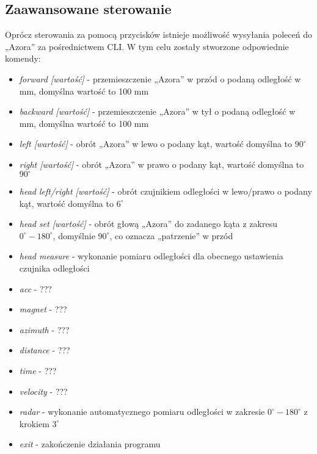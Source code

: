     \subsection{Zaawansowane sterowanie}
        Oprócz sterowania za pomocą przycisków istnieje możliwość wysyłania poleceń do „Azora” za pośrednictwem CLI. 
        W tym celu zostały stworzone odpowiednie komendy:
        \begin{itemize}
            \item \textit{forward [wartość]} - przemieszczenie „Azora” w przód o podaną odległość w mm, 
            domyślna wartość to 100 mm
            \item \textit{backward [wartość]} - przemieszczenie „Azora” w tył o podaną odległość w mm, 
            domyślna wartość to 100 mm
            \item \textit{left [wartość]} - obrót „Azora” w lewo o podany kąt, wartość domyślna to $90^\circ$
            \item \textit{right [wartość]} - obrót „Azora” w prawo o podany kąt, wartość domyślna to $90^\circ$
            \item \textit{head left/right [wartość]} - obrót czujnikiem odległości w lewo/prawo o podany kąt,
            wartość domyślna to $6^\circ$
            \item \textit{head set [wartość]} - obrót głową „Azora” do zadanego kąta z zakresu $0^\circ-180^\circ$,
            domyślnie $90^\circ$, co oznacza „patrzenie” w przód
            \item \textit{head measure} - wykonanie pomiaru odległości dla obecnego ustawienia czujnika odległości
            \item \textit{acc} - ???
            \item \textit{magnet} - ???
            \item \textit{azimuth} - ???
            \item \textit{distance} - ???
            \item \textit{time} - ???
            \item \textit{velocity} - ???
            \item \textit{radar} - wykonanie automatycznego pomiaru odległości w zakresie $0^\circ-180^\circ$ z krokiem $3^\circ$
            \item \textit{exit} - zakończenie działania programu
        \end{itemize}